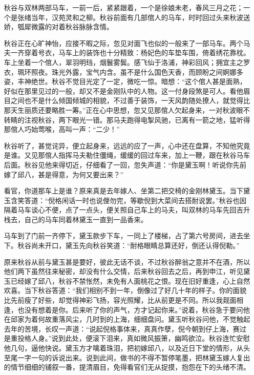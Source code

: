 \documentclass[12pt,UTF8]{ctexbook}
\begin{document}
{{{秋谷与双林两部马车，一前一后，紧紧跟着，一个是徐娘未老，春风三月之花；一个是张绪当年，汉苑灵和之柳。秋谷前面有几部倌人的马车，时时回过头来秋波送娇，瓠犀微露的对着秋谷脉脉含情。

秋谷正在心旷神怡，应接不暇之际，忽见对面飞也似的一般来了一部马车。两个马夫一齐穿着号衣，马车上的装饰也十分精致：杨妃色的车垫车围，倚着绣花靠枕。车上坐着一个倌人，翠羽明珰，烟鬟雾鬓。感飞仙于洛浦，神彩回风；拥宜主之罗衣，珮环照夜。珠光外露，宝气内含。虽不是什么国色天香，而顾盼之间婀娜多姿，丰神绝世。秋谷不觉目光定了一定，微吃一惊。暗想：“这个倌人甚是面熟，好似在那里见过的一般，却又不是金刚队中的人物。这一付身段煞是可人。看他眉目之间也不是什么倾国倾城的相貌，不过善于装饰，一天风韵随处撩人，就觉得比那天生丽质还要略胜一筹。”正在心中思想，忽又见那倌人欠起身来，一对秋波眼不转睛的注视秋谷，两下眼光一错。那马夫跑得电掣风驰，已离有一箭之地，猛听得那倌人巧始莺喉，高叫一声：“二少！”

秋谷听了，甚觉诧异，便立起身来，远远的应了一声，心中还在盘算，不知他究竟是谁。又见那倌人指挥马夫勒住僵绳，缓缓的回过车来，加上一鞭，跟在秋谷马车后面。秋谷见他来得切近，仔细看了一回，忽失声道：“你是黛玉啊！听说你先前嫁了邱八，甚是得意，为何又要出来？”

看官，你道那车上是谁？原来真是去年嫁人、坐第二把交椅的金刚林黛玉。当下黛玉含笑答道：“倪格闲话一时也说俚勿完，等歇倪到大菜间去搭耐说罢。”秋谷也因隔着马车谈心不便，点了一点头，便关照自己车上的马夫，叫双林的马车先回吉升栈去，自己的马车同着林黛玉一直到一品香来。

马车到了门前一齐停下，黛玉款步下车，一同上了楼梯，占了第六号房间，进去坐下。秋谷尚未开口，黛玉先向秋谷笑道：“耐格眼睛总算还好，倒还认得倪勒。”

原来秋谷从前与黛玉甚是要好，彼此无话不谈，不过秋谷醉翁之意并不在酒，所以他们两下虽然往来秘密，却没有什么交情，后来秋谷回去之后，再到申江，听见黛玉已经嫁了邱八，秋谷不禁怅然，未免有人面桃花之恨。现在旧好重逢，心上自然欢喜。当下秋谷答道：“我们相别不到一年，倒像过了好几十年的样子。你的面貌比先前瘦了好些，却觉得神彩飞扬，容光照耀，比从前更是不同。所以我觌面相逢，也没有想着是你。后来听了你的声气，方才记起你来。”说着，秋谷急于要问他在邱家为着何故重落风尘，几时到的上海，细细盘问。黛玉听秋谷问他，不觉触起去年的苦境，长叹一声道：“说起倪格事体来，真真作孽，倪今朝到仔上海，赛过是重投格人身。”说到此处，便滚下泪来，真如微风振箫，幽鸣欲泣。秋谷连忙安慰他几句，逼他快说。黛玉方才噙着珠泪，把初嫁邱八，以及近日下堂的情形，从头至尾一字一句的诉说出来。说到此间，做书的不得不暂停笔墨，把林黛玉嫁人复出的情节细细的铺叙一番，提清眉目，免得看官们无从捉摸，抱怨在下的头绪不清。

}}}
\end{document}

